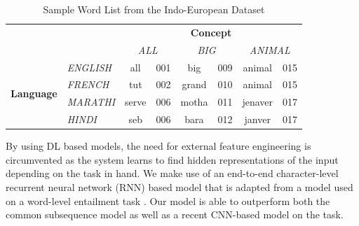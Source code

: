 \documentclass[11pt,letterpaper]{article}
\begin{document}
\begin{table}[ht]
\centering
\begin{tabular}{llcccccc}
\multicolumn{1}{c}{\textbf{}}                           & \multicolumn{1}{c}{\textbf{}}         & \multicolumn{6}{c}{\textbf{Concept}}                                                                      \\ \cline{3-8} 
\multicolumn{1}{c}{}                                    & \multicolumn{1}{c}{\textit{}}         & \multicolumn{2}{c}{\textit{ALL}} & \multicolumn{2}{c}{\textit{BIG}} & \multicolumn{2}{c}{\textit{ANIMAL}} \\ \cline{3-8} 
\multicolumn{1}{l|}{\multirow{4}{*}{\textbf{Language}}} & \multicolumn{1}{l|}{\textit{ENGLISH}} & all   & \multicolumn{1}{c|}{001} & big   & \multicolumn{1}{c|}{009} & animal   & \multicolumn{1}{c|}{015} \\ \cline{3-8} 
\multicolumn{1}{l|}{}                                   & \multicolumn{1}{l|}{\textit{FRENCH}}  & tut   & \multicolumn{1}{c|}{002} & grand & \multicolumn{1}{c|}{010} & animal   & \multicolumn{1}{c|}{015} \\ \cline{3-8} 
\multicolumn{1}{l|}{}                                   & \multicolumn{1}{l|}{\textit{MARATHI}} & serve & \multicolumn{1}{c|}{006} & motha & \multicolumn{1}{c|}{011} & jenaver  & \multicolumn{1}{c|}{017} \\ \cline{3-8} 
\multicolumn{1}{l|}{}                                   & \multicolumn{1}{l|}{\textit{HINDI}}   & seb   & \multicolumn{1}{c|}{006} & bara  & \multicolumn{1}{c|}{012} & janver   & \multicolumn{1}{c|}{017} \\ \cline{3-8} 
\end{tabular}
\label{sample_wordlist}
\caption{Sample Word List from the Indo-European Dataset}
\end{table}



By using DL based models, the need for external feature engineering is circumvented as the system learns to find hidden representations of the input depending on the task in hand. We make use of an end-to-end character-level recurrent neural network (RNN) based model that is adapted from a model used on a word-level entailment task \cite{rocktaschel2016reasoning}. Our model is able to outperform both the common subsequence model \cite{rama2015automatic} as well as a recent CNN-based model \cite{rama2016siamese} on the task. 
\end{document}
